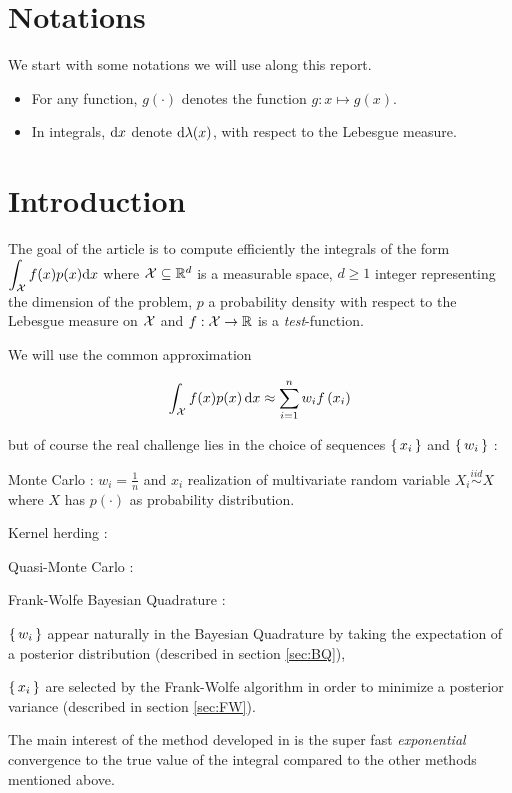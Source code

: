 \section*{Notations}
We start with some notations we will use along this report.
\begin{itemize}[font= \color{blue} \large, label= $\bullet$]
 \item For any function, $g(\cdot)$ denotes the function $g: x \mapsto g(x)$.
 \item In integrals, $\mathop{}\mathopen{}\mathrm{d} x$ denote $\mathop{}\mathopen{}\mathrm{d} \lambda(x)$, \ie with respect to the Lebesgue measure.
\end{itemize}

\section*{Introduction}

The goal of the article \cite{FWBQ} is to compute efficiently the integrals of the form
$ \displaystyle \int _ { \mathcal{X} } f ( x ) p ( x ) \mathrm { d } x$
where $\mathcal{X} \subseteq \mathbb{R} ^ { d }$ is a measurable space,
$d \geq 1$ integer representing the dimension of the problem, $p$ a probability
density with respect to the Lebesgue measure on $\mathcal{X}$ and $f : \mathcal{X} \rightarrow \mathbb{R}$
 is a \textit{test}-function.

 We will use the common approximation
 \begin{boxproblem}
   \begin{equation}
  \int _ { \mathcal{X} } f ( x ) p ( x ) \mathop{}\mathopen{}\mathrm{d} x \approx \sum _ { i = 1 } ^ { n } w _ { i } f \left( x _ { i } \right)
   \end{equation}
 \end{boxproblem}

 but of course the real challenge lies in the choice of sequences $\left \{ \, x_i \, \right \}$ and
 $\left \{ \, w_i \, \right \}$ :
  \begin{mydescription}
    \item [Monte Carlo]: $w_i = \frac{1}{n}$ and $x_i$ realization of multivariate
    random variable $X_i \stackrel{iid}{\sim} X$ where $X$ has $p(\cdot)$ as probability
    distribution.
    \item [Kernel herding]:
    \item [Quasi-Monte Carlo]:


  \item [Frank-Wolfe Bayesian Quadrature]:
  \begin{myitemize}[0.2cm]
\item $\left \{ \, w_i \, \right \}$ appear naturally in the Bayesian Quadrature by taking the expectation of a posterior distribution  (described in section \ref{sec:BQ}),
\item $\left \{ \, x_i \, \right \}$ are selected by the Frank-Wolfe algorithm in order to minimize a posterior variance (described in section \ref{sec:FW}).
\end{myitemize}
  \end{mydescription}
  The main interest of the method developed in \cite{FWBQ} is the super fast
  \textit{exponential} convergence to the true value of the integral compared to the other methods mentioned above.\\

